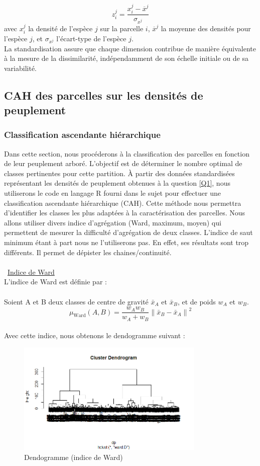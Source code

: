 \documentclass{article}
\begin{document}
\[
z_i^j = \frac{x_i^j - \overline{x}^j}{\sigma_{x^j}}
\]
avec \( x_i^j \) la densité de l’espèce \( j \) sur la parcelle \( i \), \( \overline{x}^j \) la moyenne des densités pour l’espèce \( j \), et \( \sigma_{x^j} \) l’écart-type de l’espèce \( j \).\\
La standardisation assure que chaque dimension contribue de manière équivalente à la mesure de la dissimilarité, indépendamment de son échelle initiale ou de sa variabilité.
\subsection{CAH des parcelles sur les densités de peuplement}
\subsubsection{Classification ascendante hiérarchique}
Dans cette section, nous procéderons à la classification des parcelles en fonction de leur peuplement arboré. L'objectif est de déterminer le nombre optimal de classes pertinentes pour cette partition. À partir des données standardisées représentant les densités de peuplement obtenues à la question \ref{Q1}, nous utiliserons le code en langage R fourni dans le sujet pour effectuer une classification ascendante hiérarchique (CAH). Cette méthode nous permettra d’identifier les classes les plus adaptées à la caractérisation des parcelles.
Nous allons utiliser divers indice d'agrégation (Ward, maximum, moyen) qui permettent de mesurer la difficulté d'agrégation de deux classes.
L'indice de saut minimum étant à part nous ne l'utiliserons pas. En effet, ses résultats sont trop différents. Il permet de dépister les chaines/continuité.
\\
\\
\textbullet\ \underline{Indice de Ward}
\\
L'indice de Ward est définie par :
\\
\\
Soient A et B deux classes de centre de gravité $\bar{x}_A$ et $\bar{x}_B$, et de poids $w_A$ et $w_B$.
\[
\mu_\text{Ward} (A,B) = \frac{w_A w_B}{w_A + w_B} \left\lVert \bar{x}_B - \bar{x}_A \right\lVert ^2
\]
\\
Avec cette indice, nous obtenons le dendogramme suivant :
\\
\begin{figure}[H]
    \centering
    \includegraphics[width=0.8\textwidth]{WARDDENDO.png}
    \caption{Dendogramme (indice de Ward)}
    \label{fig:Ward} 
\end{figure}
\end{document}
